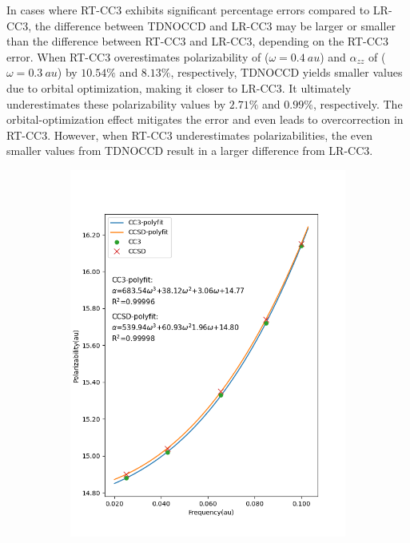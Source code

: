 In cases where RT-CC3 exhibits significant percentage errors compared to LR-CC3, the difference between TDNOCCD and LR-CC3 may be larger or smaller than the difference between RT-CC3 and LR-CC3, depending on the RT-CC3 error. When RT-CC3 overestimates polarizability of  ($\omega=0.4\ au$) and $\alpha_{zz}$ of  ($\omega=0.3\ au$) by $10.54\%$ and $8.13\%$, respectively, TDNOCCD yields smaller values due to orbital optimization, making it closer to LR-CC3. It ultimately underestimates these polarizability values by $2.71\%$ and $0.99\%$, respectively. The orbital-optimization effect mitigates the error and even leads to overcorrection in RT-CC3. However, when RT-CC3 underestimates polarizabilities, the even smaller values from TDNOCCD result in a larger difference from LR-CC3.
\begin{figure}
     \centering
     \begin{subfigure}{0.495\textwidth}
         \centering
         \includegraphics[width=\textwidth]{ch4/Figs/4-1.png}

\end{subfigure}
\end{figure}
